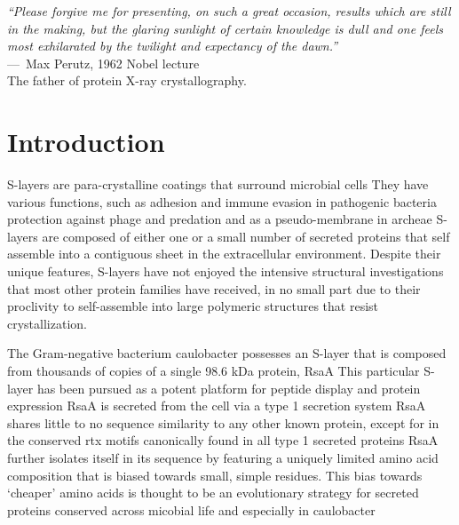 \acresetall
{}
\label{ch:crystal}
\begin{epigraph}
  \emph{``Please forgive me for presenting, on such a great occasion, results which are still in the making, but the glaring sunlight of certain knowledge is dull and one feels most exhilarated by the twilight and expectancy of the dawn.''} \\---~Max Perutz, 1962 Nobel lecture\\ The father of protein X-ray crystallography.
\end{epigraph}

\section{Introduction} %
\label{sec:crystal_introduction} 

\Acp{S-layer} are para-crystalline coatings that
surround microbial cells
 They have various functions, such as adhesion
and immune evasion in pathogenic bacteria
 protection against phage and predation
 and as a pseudo-membrane in archeae
 \acp{S-layer} are composed of either one or a small number of secreted proteins that self assemble
into a contiguous sheet in the extracellular environment. Despite their
unique features, \acp{S-layer} have not enjoyed the intensive structural
investigations that most other protein families have received, in no
small part due to their proclivity to self-assemble into large polymeric
structures that resist crystallization.

The Gram-negative bacterium \ac{caulobacter} possesses an
\ac{S-layer} that is composed from thousands of copies of a single 98.6 kDa protein, RsaA
 This particular \ac{S-layer} has been pursued as a potent platform for peptide display and
protein expression
RsaA is secreted from the cell via a type 1
secretion system
 RsaA shares little to no sequence similarity to any
other known protein, except for in the conserved \ac{rtx}
motifs canonically found in all type 1 secreted proteins
 RsaA further isolates itself in its sequence by featuring a uniquely limited amino
acid composition that is biased towards small, simple residues. This bias
towards `cheaper' amino acids is thought to be an evolutionary strategy
for secreted proteins conserved across micobial life and especially in
\ac{caulobacter}

